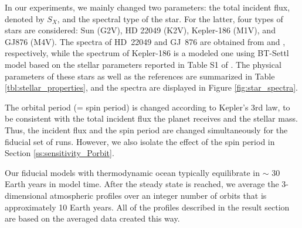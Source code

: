 \documentclass[11pt,numberedappendix,twocolappendix,]{emulateapj}
\begin{document}

In our experiments, we mainly changed two parameters: the total incident flux, denoted by $S_X$, and the spectral type of the star. 
For the latter, four types of stars are considered: 
Sun (G2V), 
HD 22049 (K2V), 
Kepler-186 (M1V), and 
GJ876 (M4V). 
The spectra of HD~22049 and GJ~876 are obtained from \citet{Segura2003} and \citet{Domagal-Goldman2014}, respectively, 
while the spectrum of Kepler-186 is a modeled one using BT-Settl model \citep{Allard2012} based on the stellar parameters reported in Table S1 of \citet{Quintana2014}. 
The physical parameters of these stars as well as the references are summarized in Table \ref{tbl:stellar_properties}, and the spectra are displayed in Figure \ref{fig:star_spectra}. 

The orbital period (= spin period) is changed according to Kepler's 3rd law, to be consistent with the total incident flux the planet receives and the stellar mass. Thus, the incident flux and the spin period are changed simultaneously for the fiducial set of runs. 
However, we also isolate the effect of the spin period in Section \ref{ss:sensitivity_Porbit}. 

Our fiducial models with thermodynamic ocean typically equilibrate in  $\sim $ 30 Earth years in model time. 
After the steady state is reached, we average the 3-dimensional atmospheric profiles over an integer number of orbits that is approximately 10 Earth years. 
All of the profiles described in the result section are based on the averaged data created this way. 
\end{document}

